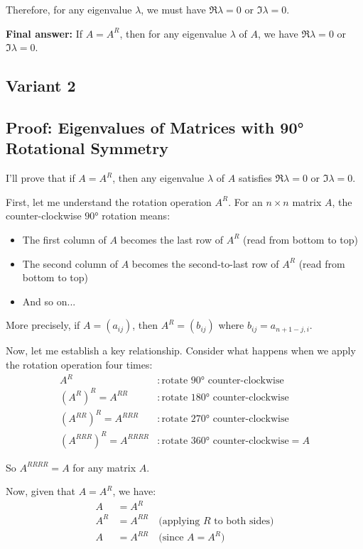 \documentclass[12pt,a4paper]{article}
\theoremstyle{definition}
\begin{document}
    Therefore, for any eigenvalue $\lambda$, we must have $\Re\lambda = 0$ or $\Im\lambda = 0$.

    \textbf{Final answer:} If $A = A^R$, then for any eigenvalue $\lambda$ of $A$, we have $\Re\lambda = 0$ or $\Im\lambda = 0$.
\subsection{Variant 2}
        \subsection*{Proof: Eigenvalues of Matrices with 90° Rotational Symmetry}

        I'll prove that if $A = A^R$, then any eigenvalue $\lambda$ of $A$ satisfies $\Re\lambda = 0$ or $\Im\lambda = 0$.

        First, let me understand the rotation operation $A^R$. For an $n \times n$ matrix $A$, the counter-clockwise $90°$ rotation means:
        \begin{itemize}
            \item The first column of $A$ becomes the last row of $A^R$ (read from bottom to top)
            \item The second column of $A$ becomes the second-to-last row of $A^R$ (read from bottom to top)
            \item And so on...
        \end{itemize}

        More precisely, if $A = (a_{ij})$, then $A^R = (b_{ij})$ where $b_{ij} = a_{n+1-j,i}$.

        Now, let me establish a key relationship. Consider what happens when we apply the rotation operation four times:
        \begin{align}
            A^R &: \text{rotate } 90° \text{ counter-clockwise} \\
            (A^R)^R = A^{RR} &: \text{rotate } 180° \text{ counter-clockwise} \\
            (A^{RR})^R = A^{RRR} &: \text{rotate } 270° \text{ counter-clockwise} \\
            (A^{RRR})^R = A^{RRRR} &: \text{rotate } 360° \text{ counter-clockwise} = A
        \end{align}

        So $A^{RRRR} = A$ for any matrix $A$.

        Now, given that $A = A^R$, we have:
        \begin{align}
            A &= A^R \\
            A^R &= A^{RR} \quad \text{(applying $R$ to both sides)} \\
            A &= A^{RR} \quad \text{(since $A = A^R$)}
        \end{align}
\end{document}
